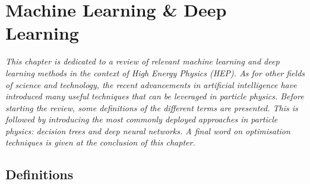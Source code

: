 \chapter{\color{oxfordblue} Machine Learning \& Deep Learning}\label{Chap-ML}
\ChapFrame

\textit{
This chapter is dedicated to a review of relevant machine learning and deep learning methods in the context of High Energy Physics (HEP). As for other fields of science and technology, the recent advancements in artificial intelligence have introduced many useful techniques that can be leveraged in particle physics. Before starting the review, some definitions of the different terms are presented. This is followed by introducing the most commonly deployed approaches in particle physics: decision trees and deep neural networks. A final word on optimisation techniques is given at the conclusion of this chapter.
}

\section{Definitions}
